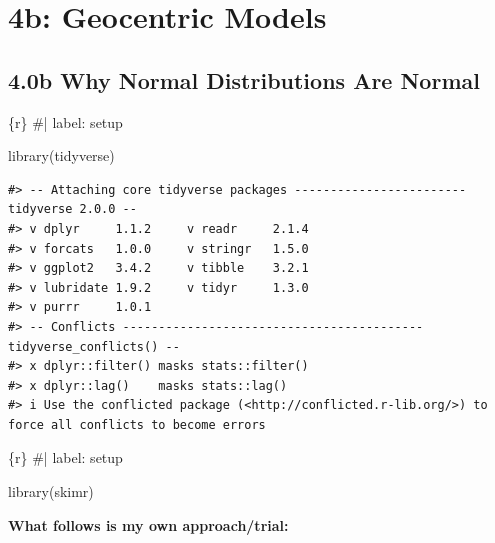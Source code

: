 \documentclass[
  letterpaper,
  DIV=11,
  numbers=noendperiod]{scrreprt}
\newenvironment{Shaded}{\begin{snugshade}}{\end{snugshade}}
\newcommand{\CommentTok}[1]{\textcolor[rgb]{0.37,0.37,0.37}{#1}}
\newcommand{\FunctionTok}[1]{\textcolor[rgb]{0.28,0.35,0.67}{#1}}
\newcommand{\InformationTok}[1]{\textcolor[rgb]{0.37,0.37,0.37}{#1}}
\newcommand{\NormalTok}[1]{\textcolor[rgb]{0.00,0.23,0.31}{#1}}
\begin{document}

\hypertarget{b-geocentric-models}{%
\chapter{4b: Geocentric Models}\label{b-geocentric-models}}

\hypertarget{b-why-normal-distributions-are-normal}{%
\section{4.0b Why Normal Distributions Are
Normal}\label{b-why-normal-distributions-are-normal}}

\begin{Shaded}
\begin{Highlighting}[]
\InformationTok{\textasciigrave{}\textasciigrave{}\textasciigrave{}\{r\}}
\CommentTok{\#| label: setup}

\FunctionTok{library}\NormalTok{(tidyverse)}
\InformationTok{\textasciigrave{}\textasciigrave{}\textasciigrave{}}
\end{Highlighting}
\end{Shaded}

\begin{verbatim}
#> -- Attaching core tidyverse packages ------------------------ tidyverse 2.0.0 --
#> v dplyr     1.1.2     v readr     2.1.4
#> v forcats   1.0.0     v stringr   1.5.0
#> v ggplot2   3.4.2     v tibble    3.2.1
#> v lubridate 1.9.2     v tidyr     1.3.0
#> v purrr     1.0.1     
#> -- Conflicts ------------------------------------------ tidyverse_conflicts() --
#> x dplyr::filter() masks stats::filter()
#> x dplyr::lag()    masks stats::lag()
#> i Use the conflicted package (<http://conflicted.r-lib.org/>) to force all conflicts to become errors
\end{verbatim}

\begin{Shaded}
\begin{Highlighting}[]
\InformationTok{\textasciigrave{}\textasciigrave{}\textasciigrave{}\{r\}}
\CommentTok{\#| label: setup}

\FunctionTok{library}\NormalTok{(skimr)}
\InformationTok{\textasciigrave{}\textasciigrave{}\textasciigrave{}}
\end{Highlighting}
\end{Shaded}

\textbf{What follows is my own approach/trial:}
\end{document}
